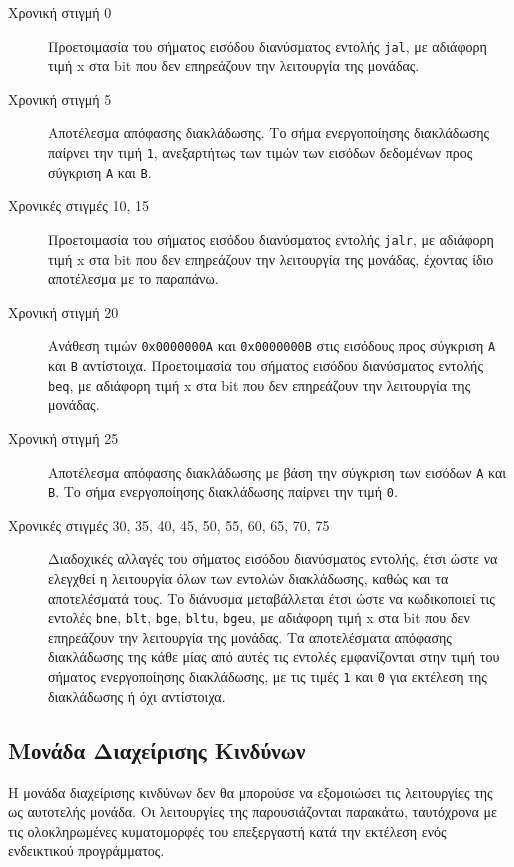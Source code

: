 \documentclass[11pt]{extarticle}
\begin{document}
\begin{description}
\item[Χρονική στιγμή 0] \hfill \newline
Προετοιμασία του σήματος εισόδου διανύσματος εντολής \texttt{jal}, με αδιάφορη τιμή x στα bit που δεν επηρεάζουν την λειτουργία της μονάδας.
\item[Χρονική στιγμή 5] \hfill \newline
Αποτέλεσμα απόφασης διακλάδωσης.
Το σήμα ενεργοποίησης διακλάδωσης παίρνει την τιμή \texttt{1}, ανεξαρτήτως των τιμών των εισόδων δεδομένων προς σύγκριση \texttt{A} και \texttt{B}.
\item[Χρονικές στιγμές 10, 15] \hfill \newline
Προετοιμασία του σήματος εισόδου διανύσματος εντολής \texttt{jalr}, με αδιάφορη τιμή x στα bit που δεν επηρεάζουν την λειτουργία της μονάδας, έχοντας ίδιο αποτέλεσμα με το παραπάνω.
\item[Χρονική στιγμή 20] \hfill \newline
Ανάθεση τιμών \texttt{0x0000000A} και \texttt{0x0000000B} στις εισόδους προς σύγκριση \texttt{A} και \texttt{B} αντίστοιχα.
Προετοιμασία του σήματος εισόδου διανύσματος εντολής \texttt{beq}, με αδιάφορη τιμή x στα bit που δεν επηρεάζουν την λειτουργία της μονάδας.
\item[Χρονική στιγμή 25] \hfill \newline
Αποτέλεσμα απόφασης διακλάδωσης με βάση την σύγκριση των εισόδων \texttt{A} και \texttt{B}.
Το σήμα ενεργοποίησης διακλάδωσης παίρνει την τιμή \texttt{0}.
\item[Χρονικές στιγμές 30, 35, 40, 45, 50, 55, 60, 65, 70, 75] \hfill \newline
Διαδοχικές αλλαγές του σήματος εισόδου διανύσματος εντολής, έτσι ώστε να ελεγχθεί η λειτουργία όλων των εντολών διακλάδωσης, καθώς και τα αποτελέσματά τους.
Το διάνυσμα μεταβάλλεται έτσι ώστε να κωδικοποιεί τις εντολές \texttt{bne}, \texttt{blt}, \texttt{bge}, \texttt{bltu}, \texttt{bgeu}, με αδιάφορη τιμή x στα bit που δεν επηρεάζουν την λειτουργία της μονάδας.
Τα αποτελέσματα απόφασης διακλάδωσης της κάθε μίας από αυτές τις εντολές εμφανίζονται στην τιμή του σήματος ενεργοποίησης διακλάδωσης, με τις τιμές \texttt{1} και \texttt{0} για εκτέλεση της διακλάδωσης ή όχι αντίστοιχα.
\end{description}
\newpage
\subsection{Μονάδα Διαχείρισης Κινδύνων}
Η μονάδα διαχείρισης κινδύνων δεν θα μπορούσε να εξομοιώσει τις λειτουργίες της ως αυτοτελής μονάδα.
Οι λειτουργίες της παρουσιάζονται παρακάτω, ταυτόχρονα με τις ολοκληρωμένες κυματομορφές του επεξεργαστή κατά την εκτέλεση ενός ενδεικτικού προγράμματος.
\end{document}
